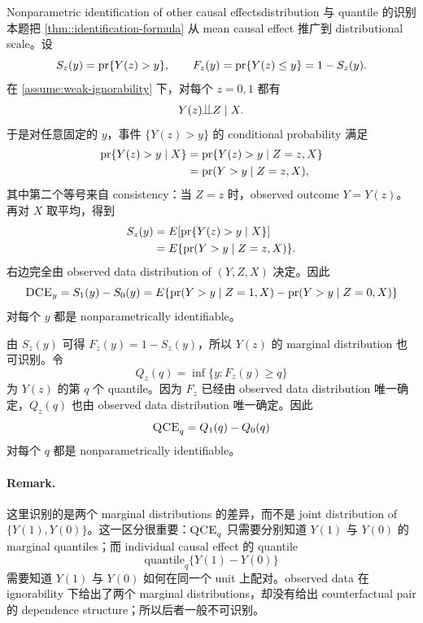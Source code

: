 \begin{exercisesolution}{Nonparametric identification of other causal effects}{distribution 与 quantile 的识别}
本题把 \cref{thm::identification-formula} 从 mean causal effect 推广到 distributional scale。设
\[
S_z(y)=\textup{pr}\{Y(z)>y\},\qquad
F_z(y)=\textup{pr}\{Y(z)\leq y\}=1-S_z(y).
\]
在 \cref{assume:weak-ignorability} 下，对每个 $z=0,1$ 都有
\[
Y(z)\ind Z\mid X.
\]
于是对任意固定的 $y$，事件 $\{Y(z)>y\}$ 的 conditional probability 满足
\begin{align*}
\textup{pr}\{Y(z)>y\mid X\}
&=\textup{pr}\{Y(z)>y\mid Z=z,X\} \\
&=\textup{pr}(Y>y\mid Z=z,X),
\end{align*}
其中第二个等号来自 consistency：当 $Z=z$ 时，observed outcome $Y=Y(z)$。再对 $X$ 取平均，得到
\begin{align*}
S_z(y)
&=E[\textup{pr}\{Y(z)>y\mid X\}] \\
&=E\{\textup{pr}(Y>y\mid Z=z,X)\}.
\end{align*}
右边完全由 observed data distribution of $(Y,Z,X)$ 决定。因此
\[
\textsc{DCE}_y
=S_1(y)-S_0(y)
=E\{\textup{pr}(Y>y\mid Z=1,X)-\textup{pr}(Y>y\mid Z=0,X)\}
\]
对每个 $y$ 都是 nonparametrically identifiable。

由 $S_z(y)$ 可得 $F_z(y)=1-S_z(y)$，所以 $Y(z)$ 的 marginal distribution 也可识别。令
\[
Q_z(q)=\inf\{y:F_z(y)\geq q\}
\]
为 $Y(z)$ 的第 $q$ 个 quantile。因为 $F_z$ 已经由 observed data distribution 唯一确定，$Q_z(q)$ 也由 observed data distribution 唯一确定。因此
\[
\textsc{QCE}_q=Q_1(q)-Q_0(q)
\]
对每个 $q$ 都是 nonparametrically identifiable。

\paragraph{Remark.}
这里识别的是两个 marginal distributions 的差异，而不是 joint distribution of $\{Y(1),Y(0)\}$。这一区分很重要：$\textsc{QCE}_q$ 只需要分别知道 $Y(1)$ 与 $Y(0)$ 的 marginal quantiles；而 individual causal effect 的 quantile
\[
\text{quantile}_q\{Y(1)-Y(0)\}
\]
需要知道 $Y(1)$ 与 $Y(0)$ 如何在同一个 unit 上配对。observed data 在 ignorability 下给出了两个 marginal distributions，却没有给出 counterfactual pair 的 dependence structure；所以后者一般不可识别。
\end{exercisesolution}

